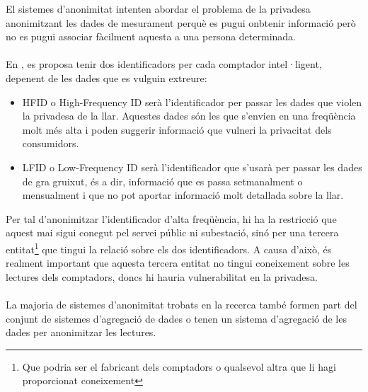 
El sistemes d'anonimitat intenten abordar el problema de la privadesa anonimitzant les dades de mesurament perquè es pugui onbtenir informació però no es pugui associar fàcilment aquesta a una persona determinada.
\\\\
En \cite{anonimity}, es proposa tenir dos identificadors per cada comptador intel·ligent, depenent de les dades que es vulguin extreure:
\begin{itemize}
	\item HFID o High-Frequency ID serà l'identificador per passar les dades que violen la privadesa de la llar. Aquestes dades són les que s'envien en una freqüència molt més alta i poden suggerir informació que vulneri la privacitat dels consumidors.
	\item LFID o Low-Frequency ID serà l'identificador que s'usarà per passar les dades de gra gruixut, és a dir, informació que es passa setmanalment o mensualment i que no pot aportar informació molt detallada sobre la llar.
\end{itemize}
Per tal d'anonimitzar l'identificador d'alta freqüència, hi ha la restricció que aquest mai sigui conegut pel servei públic ni subestació, sinó per una tercera entitat\footnote{Que podria ser el fabricant dels comptadors o qualsevol altra que li hagi proporcionat coneixement} que tingui la relació sobre els dos identificadors. A causa d'això, és realment important que aquesta tercera entitat no tingui coneixement sobre les lectures dels comptadors, doncs hi hauria vulnerabilitat en la privadesa.
\\
\\
La majoria de sistemes d'anonimitat trobats en la recerca també formen part del conjunt de sistemes d'agregació de dades o tenen un sistema d'agregació de les dades per anonimitzar les lectures.
